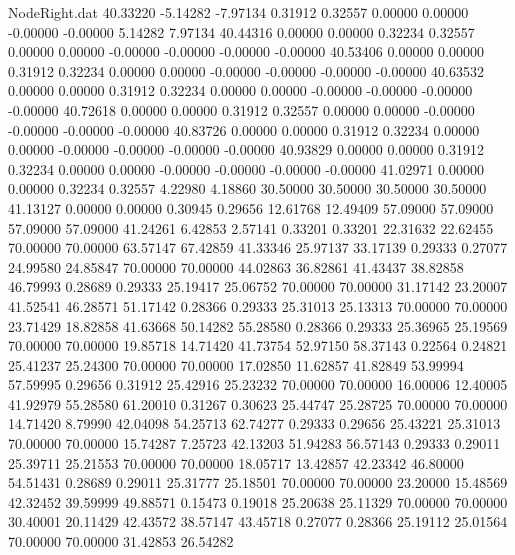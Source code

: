 \begin{filecontents}{NodeRight.dat}
  40.33220   -5.14282   -7.97134     0.31912    0.32557    0.00000    0.00000   -0.00000   -0.00000    5.14282    7.97134
  40.44316    0.00000    0.00000     0.32234    0.32557    0.00000    0.00000   -0.00000   -0.00000   -0.00000   -0.00000
  40.53406    0.00000    0.00000     0.31912    0.32234    0.00000    0.00000   -0.00000   -0.00000   -0.00000   -0.00000
  40.63532    0.00000    0.00000     0.31912    0.32234    0.00000    0.00000   -0.00000   -0.00000   -0.00000   -0.00000
  40.72618    0.00000    0.00000     0.31912    0.32557    0.00000    0.00000   -0.00000   -0.00000   -0.00000   -0.00000
  40.83726    0.00000    0.00000     0.31912    0.32234    0.00000    0.00000   -0.00000   -0.00000   -0.00000   -0.00000
  40.93829    0.00000    0.00000     0.31912    0.32234    0.00000    0.00000   -0.00000   -0.00000   -0.00000   -0.00000
  41.02971    0.00000    0.00000     0.32234    0.32557    4.22980    4.18860   30.50000   30.50000   30.50000   30.50000
  41.13127    0.00000    0.00000     0.30945    0.29656   12.61768   12.49409   57.09000   57.09000   57.09000   57.09000
  41.24261    6.42853    2.57141     0.33201    0.33201   22.31632   22.62455   70.00000   70.00000   63.57147   67.42859
  41.33346   25.97137   33.17139     0.29333    0.27077   24.99580   24.85847   70.00000   70.00000   44.02863   36.82861
  41.43437   38.82858   46.79993     0.28689    0.29333   25.19417   25.06752   70.00000   70.00000   31.17142   23.20007
  41.52541   46.28571   51.17142     0.28366    0.29333   25.31013   25.13313   70.00000   70.00000   23.71429   18.82858
  41.63668   50.14282   55.28580     0.28366    0.29333   25.36965   25.19569   70.00000   70.00000   19.85718   14.71420
  41.73754   52.97150   58.37143     0.22564    0.24821   25.41237   25.24300   70.00000   70.00000   17.02850   11.62857
  41.82849   53.99994   57.59995     0.29656    0.31912   25.42916   25.23232   70.00000   70.00000   16.00006   12.40005
  41.92979   55.28580   61.20010     0.31267    0.30623   25.44747   25.28725   70.00000   70.00000   14.71420    8.79990
  42.04098   54.25713   62.74277     0.29333    0.29656   25.43221   25.31013   70.00000   70.00000   15.74287    7.25723
  42.13203   51.94283   56.57143     0.29333    0.29011   25.39711   25.21553   70.00000   70.00000   18.05717   13.42857
  42.23342   46.80000   54.51431     0.28689    0.29011   25.31777   25.18501   70.00000   70.00000   23.20000   15.48569
  42.32452   39.59999   49.88571     0.15473    0.19018   25.20638   25.11329   70.00000   70.00000   30.40001   20.11429
  42.43572   38.57147   43.45718     0.27077    0.28366   25.19112   25.01564   70.00000   70.00000   31.42853   26.54282

\end{filecontents}
